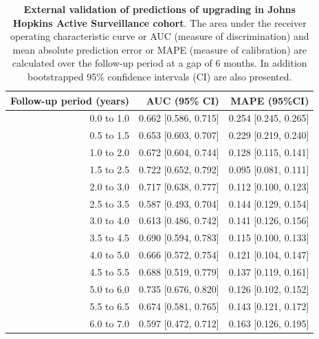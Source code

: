 \begin{table}[!htb]
\small\sf\centering
\caption{\textbf{External validation of predictions of upgrading in Johns Hopkins Active Surveillance cohort}. The area under the receiver operating characteristic curve or AUC (measure of discrimination) and mean absolute prediction error or MAPE (measure of calibration) are calculated over the follow-up period at a gap of 6 months. In addition bootstrapped 95\% confidence intervals (CI) are also presented.}
\label{tab:AUC_PE_Hopkins}
\begin{tabular}{r|r|r}
\hline
\hline
Follow-up period (years) & AUC (95\% CI) & MAPE (95\%CI)\\ 
\hline
0.0 to 1.0 & 0.662 [0.586, 0.715] & 0.254 [0.245, 0.265]\\
0.5 to 1.5 & 0.653 [0.603, 0.707] & 0.229 [0.219, 0.240]\\
1.0 to 2.0 & 0.672 [0.604, 0.744] & 0.128 [0.115, 0.141]\\
1.5 to 2.5 & 0.722 [0.652, 0.792] & 0.095 [0.081, 0.111]\\
2.0 to 3.0 & 0.717 [0.638, 0.777] & 0.112 [0.100, 0.123]\\
2.5 to 3.5 & 0.587 [0.493, 0.704] & 0.144 [0.129, 0.154]\\
3.0 to 4.0 & 0.613 [0.486, 0.742] & 0.141 [0.126, 0.156]\\
3.5 to 4.5 & 0.690 [0.594, 0.783] & 0.115 [0.100, 0.133]\\
4.0 to 5.0 & 0.666 [0.572, 0.754] & 0.121 [0.104, 0.147]\\
4.5 to 5.5 & 0.688 [0.519, 0.779] & 0.137 [0.119, 0.161]\\
5.0 to 6.0 & 0.735 [0.676, 0.820] & 0.126 [0.102, 0.152]\\
5.5 to 6.5 & 0.674 [0.581, 0.765] & 0.143 [0.121, 0.172]\\
6.0 to 7.0 & 0.597 [0.472, 0.712] & 0.163 [0.126, 0.195]\\
\hline
\end{tabular}	
\end{table}


